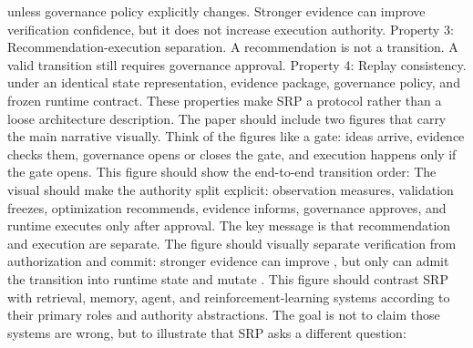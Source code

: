 {}unless governance policy explicitly changes. Stronger evidence can improve verification confidence, but it does not increase execution authority.\markdownRendererParagraphSeparator
{}Property 3: Recommendation-execution separation.\markdownRendererInterblockSeparator
{}\markdownRendererInterblockSeparator
{}A recommendation is not a transition. A valid transition still requires governance approval.\markdownRendererParagraphSeparator
{}Property 4: Replay consistency.\markdownRendererInterblockSeparator
{}\markdownRendererInterblockSeparator
{}under an identical state representation, evidence package, governance policy, and frozen runtime contract.\markdownRendererParagraphSeparator
{}These properties make SRP a protocol rather than a loose architecture description.\markdownRendererInterblockSeparator
{}
\markdownRendererSectionEnd \markdownRendererSectionBegin
{}\markdownRendererInterblockSeparator
{}The paper should include two figures that carry the main narrative visually.\markdownRendererParagraphSeparator
{}Think of the figures like a gate: ideas arrive, evidence checks them, governance opens or closes the gate, and execution happens only if the gate opens.\markdownRendererParagraphSeparator
{} This figure should show the end-to-end transition order:\markdownRendererInterblockSeparator
{}\markdownRendererInterblockSeparator
{}The visual should make the authority split explicit: observation measures, validation freezes, optimization recommends, evidence informs, governance approves, and runtime executes only after approval. The key message is that recommendation and execution are separate.\markdownRendererParagraphSeparator
{}The figure should visually separate verification from authorization and commit: stronger evidence can improve , but only  can admit the transition into runtime state and mutate .\markdownRendererParagraphSeparator
{} This figure should contrast SRP with retrieval, memory, agent, and reinforcement-learning systems according to their primary roles and authority abstractions. The goal is not to claim those systems are wrong, but to illustrate that SRP asks a different question:\markdownRendererInterblockSeparator
